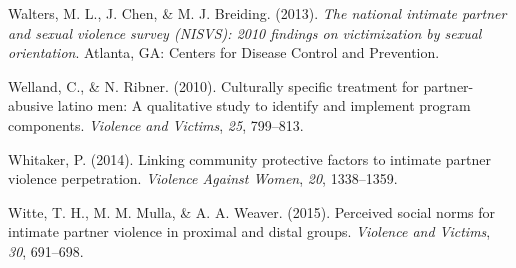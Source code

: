 \documentclass[11pt,]{tufte-book}
\begin{document}
\hypertarget{ref-walters2013national}{}
Walters, M. L., J. Chen, \& M. J. Breiding. (2013). \emph{The national
intimate partner and sexual violence survey (NISVS): 2010 findings on
victimization by sexual orientation}. Atlanta, GA: Centers for Disease
Control and Prevention.

\hypertarget{ref-welland2010culturally}{}
Welland, C., \& N. Ribner. (2010). Culturally specific treatment for
partner-abusive latino men: A qualitative study to identify and
implement program components. \emph{Violence and Victims}, \emph{25},
799--813.

\hypertarget{ref-whitaker2014linking}{}
Whitaker, P. (2014). Linking community protective factors to intimate
partner violence perpetration. \emph{Violence Against Women}, \emph{20},
1338--1359.

\hypertarget{ref-witte2015perceived}{}
Witte, T. H., M. M. Mulla, \& A. A. Weaver. (2015). Perceived social
norms for intimate partner violence in proximal and distal groups.
\emph{Violence and Victims}, \emph{30}, 691--698.
\end{document}
